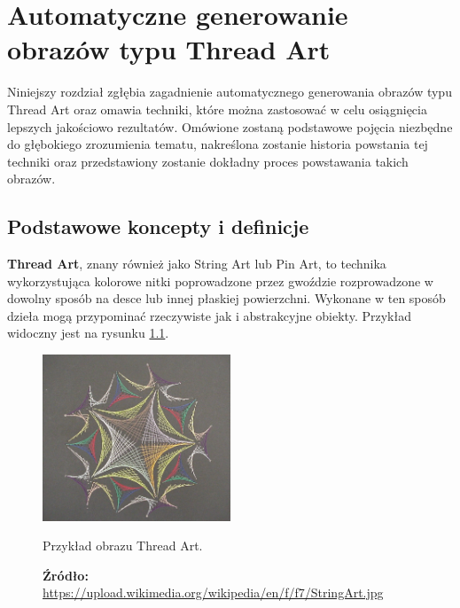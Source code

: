 \chapter{Automatyczne generowanie obrazów typu Thread Art} \label{theory}
Niniejszy rozdział zgłębia zagadnienie automatycznego generowania obrazów typu Thread Art oraz omawia techniki, które można zastosować w celu osiągnięcia lepszych jakościowo rezultatów. Omówione zostaną podstawowe pojęcia niezbędne do głębokiego zrozumienia tematu, nakreślona zostanie historia powstania tej techniki oraz przedstawiony zostanie dokładny proces powstawania takich obrazów.
    \section{Podstawowe koncepty i definicje} \label{theory-definitions}
    \textbf{Thread Art}, znany również jako String Art lub Pin Art, to technika wykorzystująca kolorowe nitki poprowadzone przez gwoździe rozprowadzone w dowolny sposób na desce lub innej płaskiej powierzchni. Wykonane w ten sposób dzieła mogą przypominać rzeczywiste jak i abstrakcyjne obiekty. Przykład widoczny jest na rysunku \ref{theory-thread-art}.
    \begin{figure}[H]
        \centering
        \includegraphics[width=0.5\textwidth,keepaspectratio]{img/2-theory/thread-art.jpg}
        \caption[Przykład obrazu Thread Art]{Przykład obrazu Thread Art.}
        \caption*{\footnotesize{\textbf{Źródło:} {\url{https://upload.wikimedia.org/wikipedia/en/f/f7/StringArt.jpg}}}}
        \label{theory-thread-art}
    \end{figure}
    
